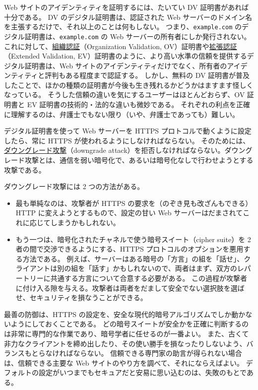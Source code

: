 \documentclass[uplatex]{jsarticle}
\def\label#1{}%
\begin{document}
Web サイトのアイデンティティを証明するには、たいてい DV 証明書があれば十分である。
DV のデジタル証明書は、認証された Web サーバーのドメイン名を主張するだけで、それ以上のことは何もしない。
つまり、\texttt{example.com} のデジタル証明書は、\texttt{example.com} の Web サーバーの所有者にしか発行されない。
これに対して、\underline{組織認証}（Organization Validation, OV）証明書や\underline{拡張認証}（Extended Validation, EV）証明書のように、より高い水準の信頼を提供するデジタル証明書は、Web サイトのアイデンティティだけでなく、所有者のアイデンティティと評判もある程度まで認証する。
しかし、無料の DV 証明書が普及したことで、ほかの種類の証明書が今後も生き残れるかどうかはますます怪しくなっている。
そうした信頼の違いを気にするユーザーはほとんどおらず、OV 証明書と EV 証明書の技術的・法的な違いも微妙である。
それぞれの利点を正確に理解するのは、弁護士でもない限り（いや、弁護士であっても）難しい。

デジタル証明書を使って Web サーバーを HTTPS プロトコルで動くように設定したら、常に HTTPS が使われるようにしなければならない。
そのためには、\underline{ダウングレード攻撃}（downgrade attack）を拒否しなければならない。ダウングレード攻撃とは、通信を弱い暗号化で、あるいは暗号化なしで行わせようとする攻撃である。

\begin{exa}\label{exa:ch11-downgrade}
ダウングレード攻撃には 2 つの方法がある。
\begin{itemize}
\item 最も単純なのは、攻撃者が HTTPS の要求を（のぞき見も改ざんもできる）HTTP に変えようとするもので、設定の甘い Web サーバーはだまされてこれに応じてしまうかもしれない。
\item もう一つは、暗号化されたチャネルで使う暗号スイート（cipher suite）を 2 者の間で交渉できるようにする、HTTPS プロトコルのオプションを悪用する方法である。
例えば、サーバーはある暗号の「方言」の組を「話せ」、クライアントは別の組を「話す」かもしれないので、両者はまず、双方のレパートリーに共通する方言について合意する必要がある。
この過程が攻撃者に付け入る隙を与える。攻撃者は両者をだまして安全でない選択肢を選ばせ、セキュリティを損なうことができる。
\end{itemize}
\end{exa}

最善の防御は、HTTPS の設定を、安全な現代的暗号アルゴリズムでしか動かないようにしておくことである。
どの暗号スイートが安全かを正確に判断するのは非常に専門的な作業であり、暗号学者に任せるのが一番よい。
また、古くて非力なクライアントを締め出したり、その使い勝手を損なったりしないよう、バランスもとらなければならない。
信頼できる専門家の助言が得られない場合は、信頼できる主要な Web サイトのやり方を調べて、それにならえばよい。
デフォルトの設定がいつまでもセキュアだと安易に思い込むのは、失敗のもとである。
\end{document}
